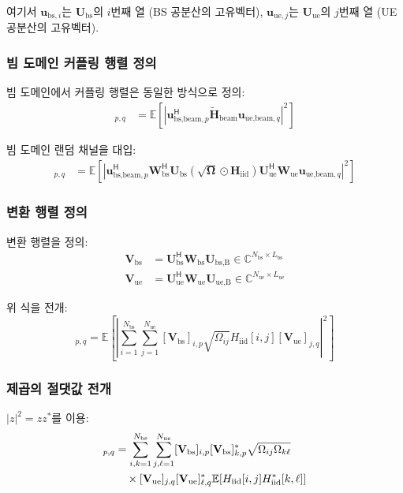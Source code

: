 \documentclass[10pt]{article}
\begin{document}
여기서 $\mathbf{u}_{\text{bs},i}$는 $\mathbf{U}_{\text{bs}}$의 $i$번째 열 (BS 공분산의 고유벡터), $\mathbf{u}_{\text{ue},j}$는 $\mathbf{U}_{\text{ue}}$의 $j$번째 열 (UE 공분산의 고유벡터).

\subsubsection{빔 도메인 커플링 행렬 정의}
빔 도메인에서 커플링 행렬은 동일한 방식으로 정의:
\begin{align}
[\boldsymbol{\Omega}_{\text{B}}]_{p,q} &= \mathbb{E}\left[|\mathbf{u}_{\text{bs,beam},p}^{\mathsf{H}} \tilde{\mathbf{H}}_{\text{beam}} \mathbf{u}_{\text{ue,beam},q}|^2\right]
\end{align}

빔 도메인 랜덤 채널을 대입:
\begin{align}
[\boldsymbol{\Omega}_{\text{B}}]_{p,q} &= \mathbb{E}\left[\left|\mathbf{u}_{\text{bs,beam},p}^{\mathsf{H}} \mathbf{W}_{\text{bs}}^{\mathsf{H}} \mathbf{U}_{\text{bs}} \left(\sqrt{\boldsymbol{\Omega}} \odot \mathbf{H}_{\text{iid}}\right) \mathbf{U}_{\text{ue}}^{\mathsf{H}} \mathbf{W}_{\text{ue}} \mathbf{u}_{\text{ue,beam},q}\right|^2\right]
\end{align}

\subsubsection{변환 행렬 정의}
변환 행렬을 정의:
\begin{align}
\mathbf{V}_{\text{bs}} &= \mathbf{U}_{\text{bs}}^{\mathsf{H}} \mathbf{W}_{\text{bs}} \mathbf{U}_{\text{bs,B}} \in \mathbb{C}^{N_{\text{bs}} \times L_{\text{bs}}} \\
\mathbf{V}_{\text{ue}} &= \mathbf{U}_{\text{ue}}^{\mathsf{H}} \mathbf{W}_{\text{ue}} \mathbf{U}_{\text{ue,B}} \in \mathbb{C}^{N_{\text{ue}} \times L_{\text{ue}}}
\end{align}

위 식을 전개:
\begin{equation}
[\boldsymbol{\Omega}_{\text{B}}]_{p,q} = \mathbb{E}\left[\left| \sum_{i=1}^{N_{\text{bs}}} \sum_{j=1}^{N_{\text{ue}}} [\mathbf{V}_{\text{bs}}]_{i,p} \sqrt{\Omega_{ij}} H_{\text{iid}}[i,j] [\mathbf{V}_{\text{ue}}]_{j,q} \right|^2\right]
\end{equation}

\subsubsection{제곱의 절댓값 전개}
$|z|^2 = z z^*$를 이용:
\begin{align}
[\boldsymbol{\Omega}_{\text{B}}]_{p,q} &= \sum_{i,k=1}^{N_{\text{bs}}} \sum_{j,\ell=1}^{N_{\text{ue}}} [\mathbf{V}_{\text{bs}}]_{i,p} [\mathbf{V}_{\text{bs}}]_{k,p}^* \sqrt{\Omega_{ij} \Omega_{k\ell}} \notag \\
&\quad \times [\mathbf{V}_{\text{ue}}]_{j,q} [\mathbf{V}_{\text{ue}}]_{\ell,q}^* \mathbb{E}[H_{\text{iid}}[i,j] H_{\text{iid}}^*[k,\ell]]
\end{align}
\end{document}
